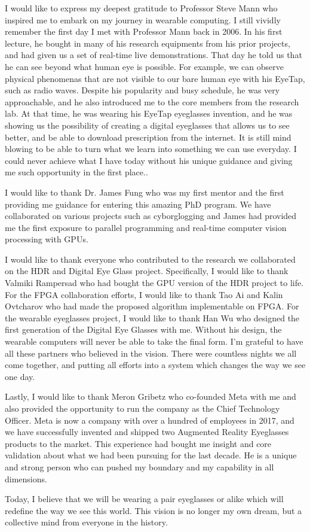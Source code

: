 I would like to express my deepest gratitude to Professor Steve Mann who inspired me to embark on my journey in wearable computing. I still vividly remember the first day I met with Professor Mann back in 2006. In his first lecture, he bought in many of his research equipments from his prior projects, and had given us a set of real-time live demonstrations. That day he told us that he can see beyond what human eye is possible. For example, we can observe physical phenomenas that are not visible to our bare human eye with his EyeTap, such as radio waves. Despite his popularity and busy schedule, he was very approachable, and he also introduced me to the core members from the research lab. At that time, he was wearing his EyeTap eyeglasses invention, and he was showing us the possibility of creating a digital eyeglasses that allows us to see better, and be able to download prescription from the internet. It is still mind blowing to be able to turn what we learn into something we can use everyday. I could never achieve what I have today without his unique guidance and giving me such opportunity in the first place.. 

I would like to thank Dr. James Fung who was my first mentor and the first providing me guidance for entering this amazing PhD program. We have collaborated on various projects such as cyborglogging and James had provided me the first exposure to parallel programming and real-time computer vision processing with GPUs. 

I would like to thank everyone who contributed to the research we collaborated on the HDR and Digital Eye Glass project. Specifically, I would like to thank Valmiki Rampersad who had bought the GPU version of the HDR project to life. For the FPGA collaboration efforts, I would like to thank Tao Ai and Kalin Ovtcharov who had made the proposed algorithm implementable on FPGA. For the wearable eyeglasses project, I would like to thank Han Wu who designed the first generation of the Digital Eye Glasses with me. Without his design, the wearable computers will never be able to take the final form. I'm grateful to have all these partners who believed in the vision. There were countless nights we all come together, and putting all efforts into a system which changes the way we see one day.
 
Lastly, I would like to thank Meron Gribetz who co-founded Meta with me and also provided the opportunity to run the company as the Chief Technology Officer. Meta is now a company with over a hundred of employees in 2017, and we have successfully invented and shipped two Augmented Reality Eyeglasses products to the market. This experience had bought me insight and core validation about what we had been pursuing for the last decade. He is a unique and strong person who can pushed my boundary and my capability in all dimensions.

Today, I believe that we will be wearing a pair eyeglasses or alike which will redefine the way we see this world. This vision is no longer my own dream, but a collective mind from everyone in the history.
